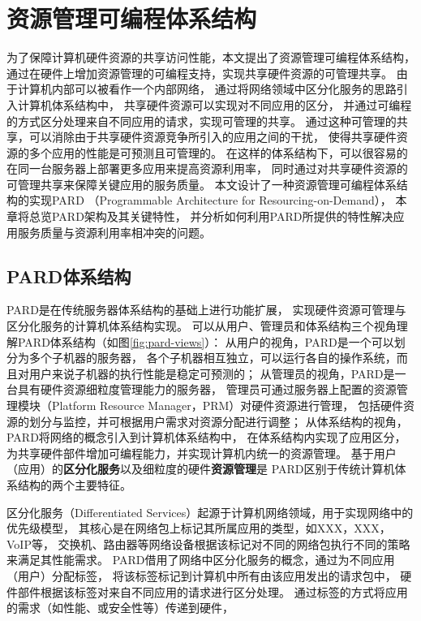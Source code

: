 

\chapter{资源管理可编程体系结构}
\label{chap:pardarch}

为了保障计算机硬件资源的共享访问性能，本文提出了资源管理可编程体系结构，
通过在硬件上增加资源管理的可编程支持，实现共享硬件资源的可管理共享。
由于计算机内部可以被看作一个内部网络，
通过将网络领域中区分化服务的思路引入计算机体系结构中，
共享硬件资源可以实现对不同应用的区分，
并通过可编程的方式区分处理来自不同应用的请求，实现可管理的共享。
通过这种可管理的共享，可以消除由于共享硬件资源竞争所引入的应用之间的干扰，
使得共享硬件资源的多个应用的性能是可预测且可管理的。
在这样的体系结构下，可以很容易的在同一台服务器上部署更多应用来提高资源利用率，
同时通过对共享硬件资源的可管理共享来保障关键应用的服务质量。
本文设计了一种资源管理可编程体系结构的实现PARD
（Programmable Architecture for Resourcing-on-Demand）\cite{pard:2015}，
本章将总览PARD架构及其关键特性，
并分析如何利用PARD所提供的特性解决应用服务质量与资源利用率相冲突的问题。


\section{PARD体系结构}

PARD是在传统服务器体系结构的基础上进行功能扩展，
实现硬件资源可管理与区分化服务的计算机体系结构实现。
可以从用户、管理员和体系结构三个视角理解PARD体系结构（如图\ref{fig:pard-views}）：
从用户的视角，PARD是一个可以划分为多个子机器的服务器，
各个子机器相互独立，可以运行各自的操作系统，而且对用户来说子机器的执行性能是稳定可预测的；
从管理员的视角，PARD是一台具有硬件资源细粒度管理能力的服务器，
管理员可通过服务器上配置的资源管理模块（Platform Resource Manager，PRM）对硬件资源进行管理，
包括硬件资源的划分与监控，并可根据用户需求对资源分配进行调整；
从体系结构的视角，PARD将网络的概念引入到计算机体系结构中，
在体系结构内实现了应用区分，为共享硬件部件增加可编程能力，并实现计算机内统一的资源管理。
基于用户（应用）的\textbf{区分化服务}以及细粒度的硬件\textbf{资源管理}是
PARD区别于传统计算机体系结构的两个主要特征。

区分化服务（Differentiated Services）起源于计算机网络领域，用于实现网络中的优先级模型，
其核心是在网络包上标记其所属应用的类型，如XXX，XXX，VoIP等，
交换机、路由器等网络设备根据该标记对不同的网络包执行不同的策略来满足其性能需求。
PARD借用了网络中区分化服务的概念，通过为不同应用（用户）分配标签，
将该标签标记到计算机中所有由该应用发出的请求包中，
硬件部件根据该标签对来自不同应用的请求进行区分处理。
通过标签的方式将应用的需求（如性能、或安全性等）传递到硬件，


